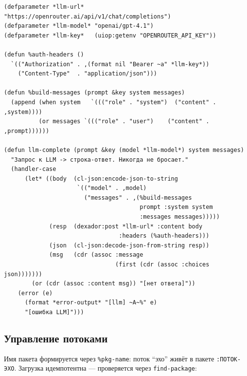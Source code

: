 \documentclass[11pt,a4paper]{article}
\begin{document}
\begin{lstlisting}[caption={мастер/cl/llm.lisp}]
(defparameter *llm-url*   "https://openrouter.ai/api/v1/chat/completions")
(defparameter *llm-model* "openai/gpt-4.1")
(defparameter *llm-key*   (uiop:getenv "OPENROUTER_API_KEY"))

(defun %auth-headers ()
  `(("Authorization" . ,(format nil "Bearer ~a" *llm-key*))
    ("Content-Type"  . "application/json")))

(defun %build-messages (prompt &key system messages)
  (append (when system   `((("role" . "system")  ("content" . ,system))))
          (or messages `((("role" . "user")    ("content" . ,prompt))))))

(defun llm-complete (prompt &key (model *llm-model*) system messages)
  "Запрос к LLM -> строка-ответ. Никогда не бросает."
  (handler-case
      (let* ((body  (cl-json:encode-json-to-string
                     `(("model" . ,model)
                       ("messages" . ,(%build-messages
                                       prompt :system system
                                       :messages messages)))))
             (resp  (dexador:post *llm-url* :content body
                                 :headers (%auth-headers)))
             (json  (cl-json:decode-json-from-string resp))
             (msg   (cdr (assoc :message
                                (first (cdr (assoc :choices json)))))))
        (or (cdr (assoc :content msg)) "[нет ответа]"))
    (error (e)
      (format *error-output* "[llm] ~A~%" e)
      "[ошибка LLM]")))
\end{lstlisting}

\subsection{Управление потоками}

Имя пакета формируется через \texttt{\%pkg-name}: поток ``эхо'' живёт в пакете \texttt{:ПОТОК-ЭХО}. Загрузка идемпотентна — проверяется через \texttt{find-package}:
\end{document}
